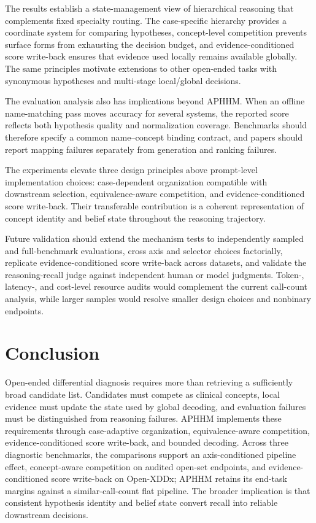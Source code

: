 \documentclass[letterpaper]{article} %
\begin{document}
The results establish a state-management view of hierarchical reasoning that complements fixed specialty routing.
The case-specific hierarchy provides a coordinate system for comparing hypotheses, concept-level competition prevents surface forms from exhausting the decision budget, and evidence-conditioned score write-back ensures that evidence used locally remains available globally.
The same principles motivate extensions to other open-ended tasks with synonymous hypotheses and multi-stage local/global decisions.

The evaluation analysis also has implications beyond APHHM.
When an offline name-matching pass moves accuracy for several systems, the reported score reflects both hypothesis quality and normalization coverage.
Benchmarks should therefore specify a common name--concept binding contract, and papers should report mapping failures separately from generation and ranking failures.

The experiments elevate three design principles above prompt-level implementation choices: case-dependent organization compatible with downstream selection, equivalence-aware competition, and evidence-conditioned score write-back.
Their transferable contribution is a coherent representation of concept identity and belief state throughout the reasoning trajectory.

Future validation should extend the mechanism tests to independently sampled and full-benchmark evaluations, cross axis and selector choices factorially, replicate evidence-conditioned score write-back across datasets, and validate the reasoning-recall judge against independent human or model judgments.
Token-, latency-, and cost-level resource audits would complement the current call-count analysis, while larger samples would resolve smaller design choices and nonbinary endpoints.

\section{Conclusion}
\label{sec:conclusion}

Open-ended differential diagnosis requires more than retrieving a sufficiently broad candidate list.
Candidates must compete as clinical concepts, local evidence must update the state used by global decoding, and evaluation failures must be distinguished from reasoning failures.
APHHM implements these requirements through case-adaptive organization, equivalence-aware competition, evidence-conditioned score write-back, and bounded decoding.
Across three diagnostic benchmarks, the comparisons support an axis-conditioned pipeline effect, concept-aware competition on audited open-set endpoints, and evidence-conditioned score write-back on Open-XDDx; APHHM retains its end-task margins against a similar-call-count flat pipeline.
The broader implication is that consistent hypothesis identity and belief state convert recall into reliable downstream decisions.
%
\end{document}
